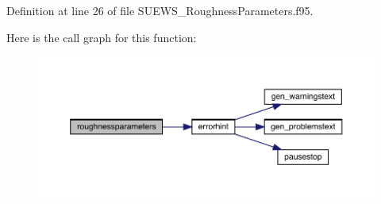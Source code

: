 Definition at line 26 of file S\+U\+E\+W\+S\+\_\+\+Roughness\+Parameters.\+f95.

Here is the call graph for this function\+:\nopagebreak
\begin{figure}[H]
\begin{center}
\leavevmode
\includegraphics[width=350pt]{_s_u_e_w_s___roughness_parameters_8f95_af045b298f2d6ed45fbb8ba93a81d9568_cgraph}
\end{center}
\end{figure}
